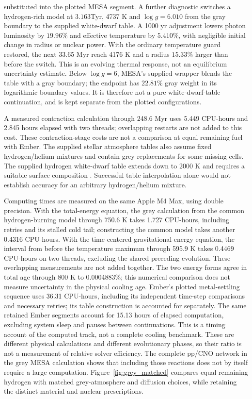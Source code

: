 \documentclass[11pt,letterpaper]{article}
\newcommand{\Tyr}{\mathrm{Tyr}}
\begin{document}
substituted into the plotted MESA segment.
A further diagnostic switches a hydrogen-rich model at
$3.163\Tyr$, 4737 K and $\log g=6.010$ from the gray boundary to the
supplied white-dwarf table. A 1000 yr adjustment lowers photon luminosity
by $19.96\%$ and effective temperature by $5.410\%$, with negligible
initial change in radius or nuclear power. With the ordinary temperature
guard restored, the next 33.65 Myr reach 4176 K and a radius $15.33\%$
larger than before the switch. This is an evolving thermal response,
not an equilibrium uncertainty estimate. Below $\log g=6$, MESA's supplied
wrapper blends the table with a gray boundary; the endpoint has $22.81\%$
gray weight in its logarithmic boundary values. It is therefore not a
pure white-dwarf-table continuation, and is kept separate from the plotted
configurations.

A measured contraction calculation through 248.6 Myr uses 5.449 CPU-hours
and 2.845 hours elapsed with two threads; overlapping restarts are not
added to this cost. These contraction-stage costs are not a comparison
at equal remaining fuel with Ember. The supplied stellar
atmosphere tables also assume fixed hydrogen/helium mixtures and contain
grey replacements for some missing cells. The supplied hydrogen white-dwarf
table extends down to 2000 K and requires a suitable surface composition
\cite{mesa_atm}. Successful table interpolation alone would not establish
accuracy for an arbitrary hydrogen/helium mixture.

Computing times are measured on the same Apple M4 Max, using double
precision. With the total-energy equation, the grey calculation from the
common hydrogen-burning model through 750.6 K takes 1.727 CPU-hours,
including retries and its stalled cold tail; constructing the common model
takes another 0.4316 CPU-hours. With the time-centered gravitational-energy
equation, the interval from before the temperature maximum through 595.9 K
takes 0.4469 CPU-hours on two threads, excluding the shared preceding
evolution. These overlapping measurements are not added together.
The two energy forms agree in total age through 800 K to 0.0004883\%;
this numerical comparison does not measure uncertainty in the physical
cooling age. Ember's plotted
metal-settling sequence uses 36.31 CPU-hours, including its independent
time-step comparisons and necessary retries; its table construction is
accounted for separately. The same retained Ember segments account for
15.13 hours of elapsed computation, excluding system sleep and pauses
between continuations. This is a timing account of the computed track,
not a complete cooling benchmark. These are different physical calculations and
different evolutionary phases, so their ratio is not a measurement of
relative solver efficiency. The complete pp/CNO network in the grey MESA
calculation shows that including those reactions does not by itself
require a large computation. Figure~\ref{fig:grey_matched} compares equal
remaining hydrogen with matched grey-atmosphere and diffusion choices,
while retaining the distinct material and nuclear prescriptions.
\end{document}
